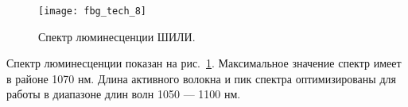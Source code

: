 \begin{figure}
  \centering
  \texttt{[image: fbg\_tech\_8]}
  \caption{Спектр люминесценции ШИЛИ.}
  \label{img:fbg_tech_6}
\end{figure}

Спектр люминесценции показан на рис.~\ref{img:fbg_tech_6}. Максимальное значение спектр имеет в районе 1070 нм. Длина активного волокна и пик спектра оптимизированы для работы в диапазоне длин волн 1050 --- 1100 нм.

\clearpage
